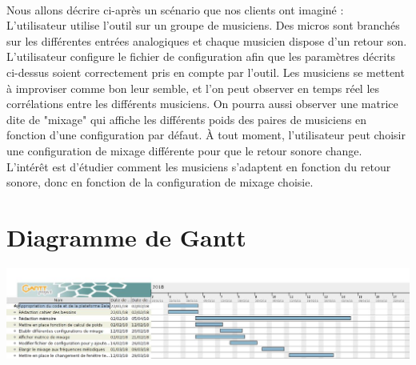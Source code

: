 \documentclass{article}
\begin{document}
      \paragraph{}
      Nous allons décrire ci-après un scénario que nos clients ont imaginé :\\
      L'utilisateur utilise l'outil sur un groupe de musiciens. Des micros sont
      branchés sur les différentes entrées analogiques et chaque musicien dispose
      d'un retour son. L'utilisateur configure le fichier de configuration afin
      que les paramètres décrits ci-dessus soient correctement pris en compte
      par l'outil. Les musiciens se mettent à improviser comme bon leur semble,
      et l'on peut observer en temps réel les corrélations entre les différents
      musiciens. On pourra aussi observer une matrice dite de "mixage" qui
      affiche les différents poids des paires de musiciens en fonction d'une
      configuration par défaut. À tout moment, l'utilisateur peut choisir une
      configuration de mixage différente pour que le retour sonore change.\\
      L'intérêt est d'étudier comment les musiciens s'adaptent en fonction du
      retour sonore, donc en fonction de la configuration de mixage choisie.
  \section{Diagramme de Gantt}
    \includegraphics[scale=0.35]{DiagrammeAnalyseBesoins.jpg}
  
\end{document}
